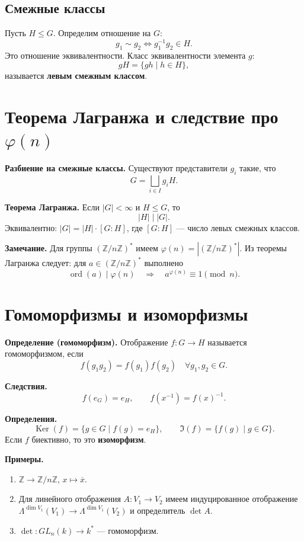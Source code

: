 \documentclass[12pt,a4paper]{article}
\newcommand{\Z}{\mathbb{Z}}
\DeclareMathOperator{\ord}{ord}
\DeclareMathOperator{\Ker}{Ker}
\begin{document}
\subsection{Смежные классы}

Пусть $H\le G$. Определим отношение на $G$:
\[
g_1 \sim g_2 \iff g_1^{-1}g_2\in H.
\]
Это отношение эквивалентности. Класс эквивалентности элемента $g$:
\[
gH=\{gh\mid h\in H\},
\]
называется \textbf{левым смежным классом}.

\section{Теорема Лагранжа и следствие про $\varphi(n)$}

\textbf{Разбиение на смежные классы.}
Существуют представители $g_i$ такие, что
\[
G=\bigsqcup_{i\in I} g_iH.
\]

\textbf{Теорема Лагранжа.}
Если $|G|<\infty$ и $H\le G$, то
\[
|H|\mid |G|.
\]
Эквивалентно: $|G|=|H|\cdot [G:H]$, где $[G:H]$ — число левых смежных классов.

\textbf{Замечание.}
Для группы $(\Z/n\Z)^{\ast}$ имеем $\varphi(n)=|(\Z/n\Z)^{\ast}|$.
Из теоремы Лагранжа следует: для $a\in(\Z/n\Z)^{\ast}$ выполнено
\[
\ord(a)\mid \varphi(n)\quad\Rightarrow\quad a^{\varphi(n)}\equiv 1\pmod n.
\]

\section{Гомоморфизмы и изоморфизмы}

\textbf{Определение (гомоморфизм).}
Отображение $f:G\to H$ называется гомоморфизмом, если
\[
f(g_1g_2)=f(g_1)f(g_2)\quad \forall g_1,g_2\in G.
\]

\textbf{Следствия.}
\[
f(e_G)=e_H,\qquad f(x^{-1})=f(x)^{-1}.
\]

\textbf{Определения.}
\[
\Ker(f)=\{g\in G\mid f(g)=e_H\},\qquad
\Im(f)=\{f(g)\mid g\in G\}.
\]
Если $f$ биективно, то это \textbf{изоморфизм}.

\textbf{Примеры.}
\begin{enumerate}
  \item $\Z \to \Z/n\Z$, \; $x\mapsto \overline{x}$.
  \item Для линейного отображения $A:V_1\to V_2$ имеем индуцированное отображение
  $\Lambda^{\dim V_1}(V_1)\to \Lambda^{\dim V_1}(V_2)$ и определитель $\det A$.
  \item $\det:GL_n(k)\to k^{\ast}$ — гомоморфизм.
\end{enumerate}
\end{document}
